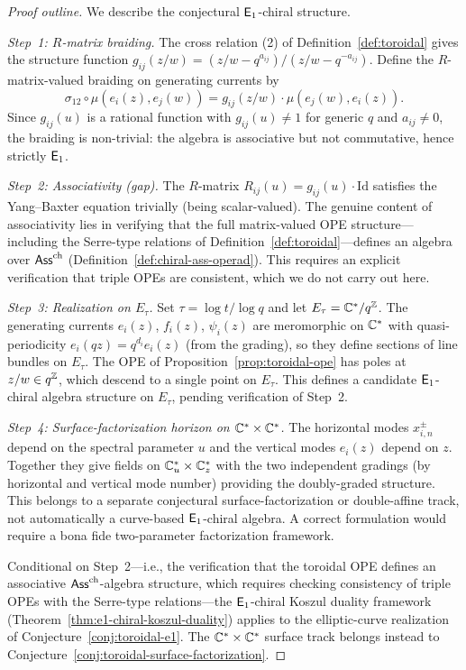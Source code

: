 \begin{proof}[Proof outline]
We describe the conjectural $\mathsf{E}_1$-chiral structure.

\emph{Step~1: $R$-matrix braiding.}
The cross relation (2) of Definition~\ref{def:toroidal} gives the
structure function $g_{ij}(z/w) = (z/w - q^{a_{ij}})/(z/w - q^{-a_{ij}})$.
Define the $R$-matrix-valued braiding on generating currents by
\[
\sigma_{12} \circ \mu(e_i(z), e_j(w))
= g_{ij}(z/w) \cdot \mu(e_j(w), e_i(z)).
\]
Since $g_{ij}(u)$ is a rational function with $g_{ij}(u) \neq 1$
for generic $q$ and $a_{ij} \neq 0$, the braiding is non-trivial:
the algebra is associative but not commutative, hence strictly $\mathsf{E}_1$.

\emph{Step~2: Associativity (gap).}
The $R$-matrix $R_{ij}(u) = g_{ij}(u) \cdot \mathrm{Id}$ satisfies
the Yang--Baxter equation trivially (being scalar-valued).
The genuine content of associativity lies in verifying that the
full matrix-valued OPE structure---including the Serre-type relations
of Definition~\ref{def:toroidal}---defines an algebra over $\mathsf{Ass}^{\mathrm{ch}}$
(Definition~\ref{def:chiral-ass-operad}).  This requires an explicit
verification that triple OPEs are consistent, which we do not
carry out here.

\emph{Step~3: Realization on $E_\tau$.}
Set $\tau = \log t / \log q$ and let $E_\tau = \mathbb{C}^*/q^{\mathbb{Z}}$.
The generating currents $e_i(z)$, $f_i(z)$, $\psi_i(z)$ are meromorphic
on $\mathbb{C}^*$ with quasi-periodicity $e_i(qz) = q^{d_i} e_i(z)$
(from the grading), so they define sections of line bundles on $E_\tau$.
The OPE of Proposition~\ref{prop:toroidal-ope} has poles at
$z/w \in q^{\mathbb{Z}}$, which descend to a single point on $E_\tau$.
This defines a candidate $\mathsf{E}_1$-chiral algebra structure on $E_\tau$,
pending verification of Step~2.

\emph{Step~4: Surface-factorization horizon on $\mathbb{C}^* \times \mathbb{C}^*$.}
The horizontal modes $x^\pm_{i,n}$ depend on the spectral
parameter $u$ and the vertical modes $e_i(z)$ depend on $z$.
Together they give fields on $\mathbb{C}^*_u \times \mathbb{C}^*_z$ with the
two independent gradings (by horizontal and vertical mode number)
providing the doubly-graded structure.  This belongs to a separate
conjectural surface-factorization or double-affine track, not
automatically a
curve-based $\mathsf{E}_1$-chiral algebra.  A correct formulation would
require a bona fide two-parameter factorization framework.

Conditional on Step~2---i.e., the verification that the toroidal OPE
defines an associative $\mathsf{Ass}^{\mathrm{ch}}$-algebra structure, which requires
checking consistency of triple OPEs with the Serre-type relations---the
$\mathsf{E}_1$-chiral Koszul duality framework
(Theorem~\ref{thm:e1-chiral-koszul-duality}) applies to the
elliptic-curve realization of Conjecture~\ref{conj:toroidal-e1}.  The
$\mathbb{C}^* \times \mathbb{C}^*$ surface track belongs instead to
Conjecture~\ref{conj:toroidal-surface-factorization}.
\end{proof}


